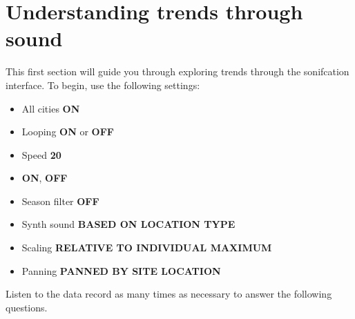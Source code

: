 \documentclass[12pt]{exam}
\begin{document}
\newcommand{\instructions}[1]{%
\vspace{1in}%
\begin{EnvUplevel}
#1
\end{EnvUplevel}
}


\section*{Understanding trends through sound}

\noindent This first section will guide you through exploring  trends through the sonifcation interface. To begin, use the following settings:
\begin{itemize}[noitemsep]
\item All cities \textbf{ON}
\item Looping \textbf{ON} or \textbf{OFF}
\item Speed \textbf{20}
\item {} \textbf{ON},  \textbf{OFF}
\item Season filter \textbf{OFF}
\item Synth sound \textbf{BASED ON LOCATION TYPE}
\item Scaling \textbf{RELATIVE TO INDIVIDUAL MAXIMUM}
\item Panning \textbf{PANNED BY SITE LOCATION}
\end{itemize}

\noindent Listen to the data record as many times as necessary to answer the following questions.
\end{document}
